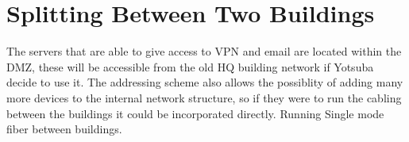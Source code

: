 \section{Splitting Between Two Buildings}
The servers that are able to give access to VPN and email are located within the DMZ, these will be accessible from the old HQ building network if Yotsuba decide to use it. The addressing scheme also allows the possiblity of adding many more devices to the internal network structure, so if they were to run the cabling between the buildings it could be incorporated directly. 
Running Single mode fiber between buildings.
